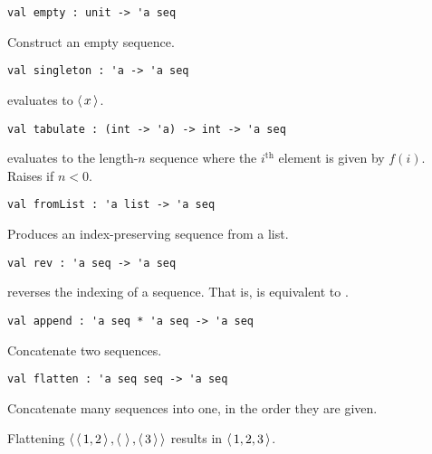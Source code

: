 \begin{gram}[empty]
\label{gr:empty}
\begin{verbatim}
val empty : unit -> 'a seq
\end{verbatim}
Construct an empty sequence.
\end{gram}

\begin{gram}[singleton]
\label{gr:singleton}
\begin{verbatim}
val singleton : 'a -> 'a seq
\end{verbatim}
 evaluates to $\left\langle\, x \,\right\rangle$.
\end{gram}

\begin{gram}[tabulate]
\label{gr:tabulate}
\begin{verbatim}
val tabulate : (int -> 'a) -> int -> 'a seq
\end{verbatim}
 evaluates to the length-$n$ sequence where the $i^\text{th}$
element is given by $f(i)$. Raises  if $n < 0$.
\end{gram}

\begin{gram}[fromList]
\label{gr:fromList}
\begin{verbatim}
val fromList : 'a list -> 'a seq
\end{verbatim}
Produces an index-preserving sequence from a list.
\end{gram}

\begin{gram}[rev]
\label{gr:rev}
\begin{verbatim}
val rev : 'a seq -> 'a seq
\end{verbatim}
 reverses the indexing of a sequence. That is, 
is equivalent to .
\end{gram}

\begin{gram}[append]
\label{gr:append}
\begin{verbatim}
val append : 'a seq * 'a seq -> 'a seq
\end{verbatim}
Concatenate two sequences.
\end{gram}

\begin{flex}
\begin{gram}[flatten]
\label{gr:flatten}
\begin{verbatim}
val flatten : 'a seq seq -> 'a seq
\end{verbatim}
Concatenate many sequences into one, in the order they are given.
\end{gram}
\begin{example}
Flattening $\left\langle\, \left\langle\, 1,2 \,\right\rangle,\left\langle\,  \,\right\rangle,\left\langle\, 3 \,\right\rangle \,\right\rangle$ results in $\left\langle\, 1,2,3 \,\right\rangle$.
\end{example}
\end{flex}

